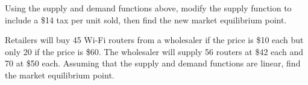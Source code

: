 \documentclass[../mathNotesPreamble]{subfiles}
\begin{document}
  \begin{ex*}
    Using the supply and demand functions above, modify the supply function to include a \$14 tax per unit sold, then find the new market equilibrium point.
  \end{ex*}
  \pagebreak

  \begin{ex*}
    Retailers will buy 45 Wi-Fi routers from a wholesaler if the price is \$10 each but only 20 if the price is \$60. The wholesaler will supply 56 routers at \$42 each and 70 at \$50 each. Assuming that the supply and demand functions are linear, find the market equilibrium point.
  \end{ex*}
  \pagebreak

  \pagebreak
\end{document}
